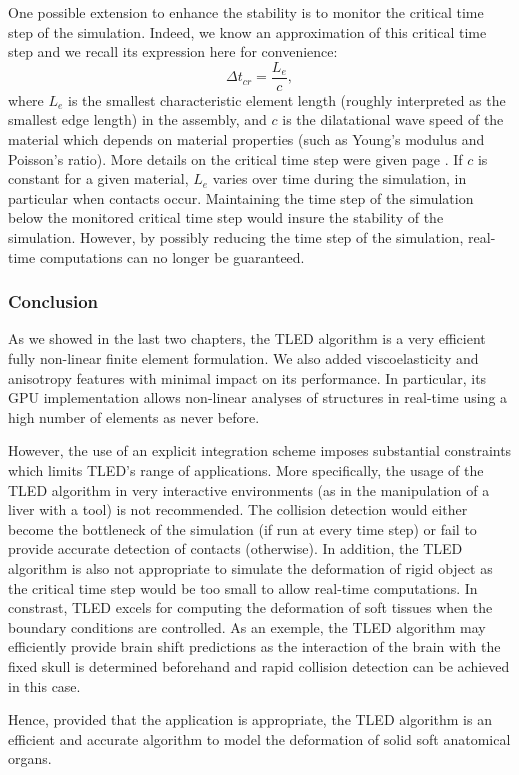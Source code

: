 One possible extension to enhance the stability is to monitor the critical time step of the simulation. Indeed, we know an approximation of this critical time step and we recall its expression here for convenience:
\begin{equation}
\Delta t_{cr} = \dfrac{L_e}{c},
\end{equation}
where $ L_e $ is the smallest characteristic element length (roughly interpreted as the smallest edge length) in the assembly, and $c$ is the dilatational wave speed of the material which depends on material properties (such as Young's modulus and Poisson's ratio). More details on the critical time step were given page \pageref{chap5:criticalTimestep}. If $c$ is constant for a given material, $ L_e $ varies over time during the simulation, in particular when contacts occur. Maintaining the time step of the simulation below the monitored critical time step would insure the stability of the simulation. However, by possibly reducing the time step of the simulation, real-time computations can no longer be guaranteed. 


	\subsubsection{Conclusion}
As we showed in the last two chapters, the TLED algorithm is a very efficient fully non-linear finite element formulation. We also added viscoelasticity and anisotropy features with minimal impact on its performance. In particular, its GPU implementation allows non-linear analyses of structures in real-time using a high number of elements as never before. 

However, the use of an explicit integration scheme imposes substantial constraints which limits TLED's range of applications. More specifically, the usage of the TLED algorithm in very interactive environments (as in the manipulation of a liver with a tool) is not recommended. The collision detection would either become the bottleneck of the simulation (if run at every time step) or fail to provide accurate detection of contacts (otherwise). In addition, the TLED algorithm is also not appropriate to simulate the deformation of rigid object as the critical time step would be too small to allow real-time computations. In constrast, TLED excels for computing the deformation of soft tissues when the boundary conditions are controlled. As an exemple, the TLED algorithm may efficiently provide brain shift predictions as the interaction of the brain with the fixed skull is determined beforehand and rapid collision detection can be achieved in this case. 

Hence, provided that the application is appropriate, the TLED algorithm is an efficient and accurate algorithm to model the deformation of solid soft anatomical organs.
\OFF
